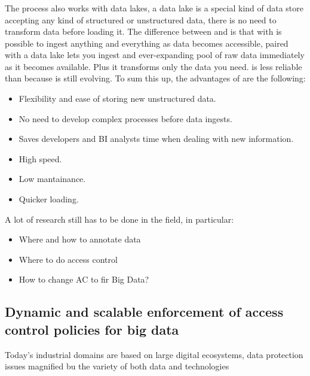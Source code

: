 \subsubsection{\elt}
The \elt process also works with data lakes, a data lake is a special kind of data store accepting any kind of structured or unstructured data, there is no need to transform data before loading it. \n
The difference between \etl and \elt is that with \elt is possible to ingest anything and everything as data becomes accessible, \elt paired with a data lake lets you ingest and ever-expanding pool of raw data immediately as it becomes available. Plus it transforms only the data you need. \n
\elt is less reliable than \etl because \elt is still evolving. \n
To sum this up, the advantages of \elt are the following:
\begin{itemize}
    \item Flexibility and ease of storing new unstructured data.
    \item No need to develop complex \etl processes before data ingests.
    \item Saves developers and BI analysts time when dealing with new information.
    \item High speed.
    \item Low mantainance.
    \item Quicker loading.
\end{itemize}
\smallSpace
A lot of research still has to be done in the field, in particular:
\begin{itemize}
    \item Where and how to annotate data
    \item Where to do access control
    \item How to change AC to fir Big Data?
\end{itemize}
\subsection{Dynamic and scalable enforcement of access control policies for big data}
Today's industrial domains are based on large digital ecosystems, data protection issues magnified bu the variety of both data and technologies 